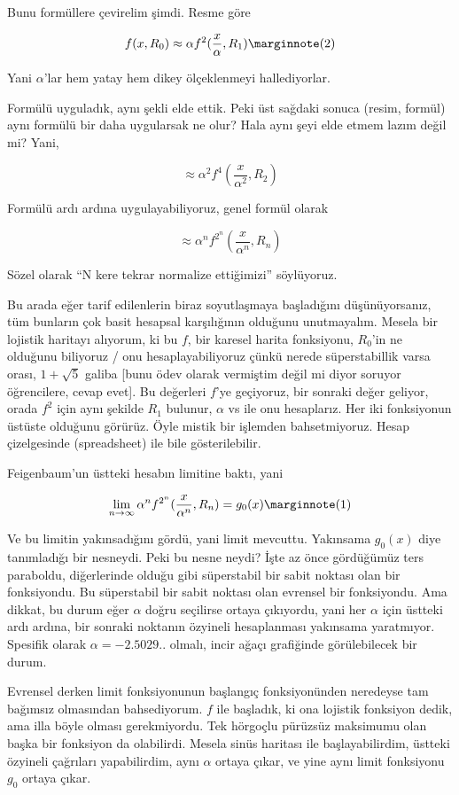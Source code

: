 \documentclass[12pt,fleqn]{article}\usepackage{../../common}
\begin{document}
Bunu formüllere çevirelim şimdi. Resme göre

$$ f(x, R_0) \approx \alpha f^2(\frac{x}{\alpha}, R_1) 
\mlabel{2}$$

Yani $\alpha$'lar hem yatay hem dikey ölçeklenmeyi hallediyorlar. 

Formülü uyguladık, aynı şekli elde ettik. Peki üst sağdaki sonuca (resim,
formül) aynı formülü bir daha uygularsak ne olur? Hala aynı şeyi elde etmem
lazım değil mi? Yani,

$$  \approx \alpha^2 f^4(\frac{x}{\alpha^2}, R_2) $$

Formülü ardı ardına uygulayabiliyoruz, genel formül olarak 

$$  \approx \alpha^{n} f^{2^n}(\frac{x}{\alpha^{n}}, R_n) $$

Sözel olarak ``N kere tekrar normalize ettiğimizi'' söylüyoruz.

Bu arada eğer tarif edilenlerin biraz soyutlaşmaya başladığını düşünüyorsanız,
tüm bunların çok basit hesapsal karşılığının olduğunu unutmayalım. Mesela bir
lojistik haritayı alıyorum, ki bu $f$, bir karesel harita fonksiyonu, $R_0$'in
ne olduğunu biliyoruz / onu hesaplayabiliyoruz çünkü nerede süperstabillik varsa
orası, $1+\sqrt{5}$ galiba [bunu ödev olarak vermiştim değil mi diyor soruyor
  öğrencilere, cevap evet]. Bu değerleri $f$'ye geçiyoruz, bir sonraki değer
geliyor, orada $f^2$ için aynı şekilde $R_1$ bulunur, $\alpha$ vs ile onu
hesaplarız. Her iki fonksiyonun üstüste olduğunu görürüz. Öyle mistik bir
işlemden bahsetmiyoruz. Hesap çizelgesinde (spreadsheet) ile bile
gösterilebilir.

Feigenbaum'un üstteki hesabın limitine baktı, yani

$$ 
\lim_{n \to \infty}  \alpha^n f^{2^n}(\frac{x}{\alpha^{n}}, R_n) = g_0(x) 
\mlabel{1}
$$

Ve bu limitin yakınsadığını gördü, yani limit mevcuttu. Yakınsama $g_0(x)$ diye
tanımladığı bir nesneydi.  Peki bu nesne neydi? İşte az önce gördüğümüz ters
paraboldu, diğerlerinde olduğu gibi süperstabil bir sabit noktası olan bir
fonksiyondu. Bu süperstabil bir sabit noktası olan evrensel bir fonksiyondu. Ama
dikkat, bu durum eğer $\alpha$ doğru seçilirse ortaya çıkıyordu, yani her
$\alpha$ için üstteki ardı ardına, bir sonraki noktanın özyineli hesaplanması
yakınsama yaratmıyor. Spesifik olarak $\alpha = -2.5029..$ olmalı, incir ağaçı
grafiğinde görülebilecek bir durum.

Evrensel derken limit fonksiyonunun başlangıç fonksiyonünden neredeyse tam
bağımsız olmasından bahsediyorum. $f$ ile başladık, ki ona lojistik fonksiyon
dedik, ama illa böyle olması gerekmiyordu. Tek hörgoçlu pürüzsüz maksimumu olan
başka bir fonksiyon da olabilirdi. Mesela sinüs haritası ile başlayabilirdim,
üstteki özyineli çağrıları yapabilirdim, aynı $\alpha$ ortaya çıkar, ve yine
aynı limit fonksiyonu $g_0$ ortaya çıkar.
\end{document}
